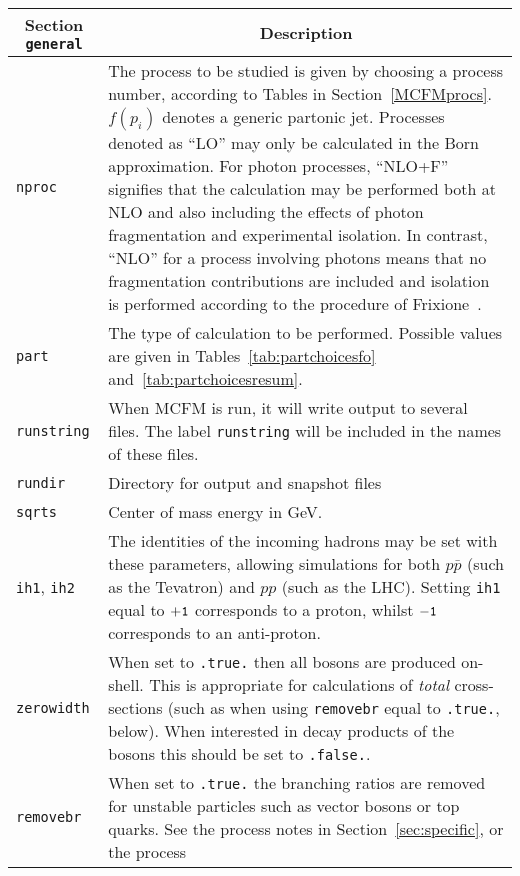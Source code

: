\begin{longtable}{p{1.5cm}p{12cm}}
		\hline
		\multicolumn{1}{c}{{\textbf{Section} \texttt{general}}} & \multicolumn{1}{c}{{\textbf{Description}}} \\ 
		\hline
		\texttt{nproc} & 
		The process to be studied is given by
		choosing a process number, according to Tables
		in Section~\ref{MCFMprocs}.
		$f(p_i)$ denotes a generic partonic jet. Processes denoted as
		``LO'' may only be calculated in the Born approximation. For photon
		processes, ``NLO+F'' signifies that the calculation may be performed
		both at NLO and also including the effects of photon fragmentation
		and experimental isolation. In contrast, ``NLO'' for a process involving
		photons means that no fragmentation contributions are included and isolation
		is performed according to the procedure of Frixione~\cite{Frixione:1998jh}.	\\
 		\texttt{part} &
		The type of calculation to be performed.  Possible values are given in 
		Tables~\ref{tab:partchoicesfo} and~\ref{tab:partchoicesresum}. \\
		\texttt{runstring} &
		When MCFM is run, it will write output to several files. The
		label {\tt runstring} will be included in the names of these files.
		\\
		\texttt{rundir} &
		Directory for output and snapshot files
		\\
		\texttt{sqrts} & Center of mass energy in GeV. \\
		\texttt{ih1}, \texttt{ih2} &
		The identities of the incoming hadrons
		may be set with these parameters, allowing simulations for both
		$p{\bar p}$ (such as the Tevatron) and $pp$ (such as the LHC). 
		Setting {\tt ih1} equal to ${\tt +1}$ corresponds to
		a proton, whilst ${\tt -1}$ corresponds to an anti-proton. \\
		\texttt{zerowidth} &
		When set to {\tt .true.} then all 
		bosons are produced on-shell. This is appropriate for calculations
		of {\it total} cross-sections (such as when using {\tt removebr} equal
		to {\tt .true.}, below). When interested in decay products of the
		bosons this should be set to {\tt .false.}. \\
		\texttt{removebr} &
		When set to {\tt .true.} the branching ratios are 
		removed for unstable particles such as vector bosons or top quarks. See the
		process notes in Section~\ref{sec:specific}, or the process

\end{longtable}
